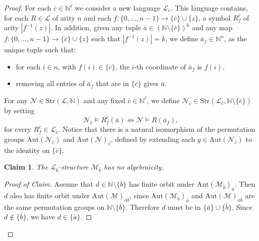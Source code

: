 \documentclass[11pt]{amsart}
\theoremstyle{plain}
\newtheorem{claim}[theorem]{Claim}
\theoremstyle{definition}
\newcommand{\N}{\mathbb{N}}
\begin{document}
\begin{proof}
For each $\bar{c}\in \mathbb{N}^{\ell}$  we  consider a new language $\mathcal{L}_{\bar{c}}$. This language  contains, for each  $R\in \mathcal{L}$ of arity $n$ and each  $f\colon \{0,\ldots,n-1\}\to \{\bar{c}\}\cup \{z\}$,   a symbol $R^{\bar{c}}_f$ of arity $|f^{-1}(z)|$. In addition, given any tuple $\bar{a}\in (\N\setminus \{\bar{c}\})^k$ and any map $f\colon \{0,\ldots,n-1\}\to \{\bar{c}\}\cup \{z\}$ such that $|f^{-1}(z)|=k$, we define $\bar{a}_f\in \N^{n}$, as the unique tuple such that:
\begin{itemize}
    \item[$i)$]  for each $i\in n$, with $f(i)\in \{\bar{c}\}$,  the $i$-th coordinate of $\bar{a}_f$ is $f(i)$,
    \item[$ii)$] removing all entries of $\bar{a}_f$ that are in $\{\bar{c}\}$ gives $\bar{a}$.
\end{itemize}

For any $\mathcal{N}\in  \mathrm{Str}(\mathcal{L},\N)$ and any fixed $\bar{c}\in \mathbb{N}^{\ell}$, we define $\mathcal{N}_{\bar{c}}\in \mathrm{Str}(\mathcal{L}_{\bar{c}},\N\setminus \{\bar{c}\})$  by setting
\[\mathcal{N}_{\bar{c}}\models R^{\bar{c}}_f(\bar{a}) \iff  \mathcal{N}\models R(\bar{a}_f),\]
for every  $R^{\bar{c}}_f\in \mathcal{L}_{\bar{c}}$. Notice that there is a natural isomorphism of the permutation groups   $\mathrm{Aut}(\mathcal{N}_{\bar{c}})$  and  $\mathrm{Aut}(\mathcal{N})_{\bar{c}}$, defined by extending each $g\in\mathrm{Aut}(\mathcal{N}_{\bar{c}})$ to the identity on $\{\bar{c}\}$.


\begin{claim}\label{Claim:NoAlg}
The $\mathcal{L}_{\bar{b}}$-structure   $\mathcal{M}_{\bar{b}}$ has no algebraicity.
\end{claim}
\begin{proof}[Proof of Claim]
Assume that  $d\in \N\setminus \{\bar{b}\}$ has finite orbit under $\mathrm{Aut}(\mathcal{M}_{\bar{b}})_{\bar{a}}$. Then $d$ also has finite orbit under $\mathrm{Aut}(\mathcal{M})_{\bar{a}\bar{b}}$, since  $\mathrm{Aut}(\mathcal{M}_{\bar{b}})_{\bar{a}}$ and  $\mathrm{Aut}(\mathcal{M})_{\bar{a}\bar{b}}$ are the same permutation groups on $\N \setminus \{\bar{b}\}$. Therefore $d$ must be in $\{\bar{a}\}\cup \{\bar{b}\}$. Since  $d\not\in \{\bar{b}\}$, we have $d\in\{\bar{a}\}$.
\end{proof}







\end{proof}
\end{document}
